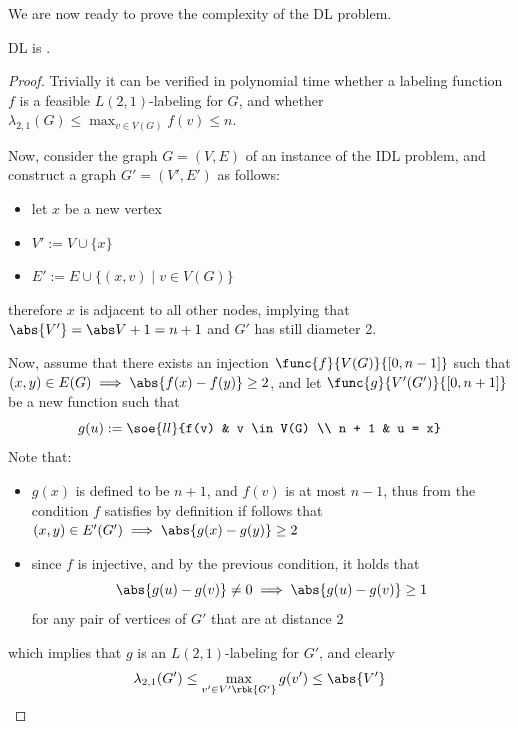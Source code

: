 \documentclass[a4paper, 12pt]{report}
\begin{document}
    We are now ready to prove the complexity of the DL problem.

    \begin{framedthm}{}
        DL is \NPComplete.
    \end{framedthm}

    \begin{proof}
        Trivially it can be verified in polynomial time whether a labeling function $f$ is a feasible $L(2,1)$-labeling for $G$, and whether $\displaystyle \lambda_{2,1}(G) \le \max_{v \in V(G)}{f(v)} \le n$.

        Now, consider the graph $G = (V, E)$ of an instance of the IDL problem, and construct a graph $G' = (V', E')$ as follows:

        \begin{itemize}
            \item let $x$ be a new vertex
            \item $V' := V \cup \{x\}$
            \item $E' := E \cup \{(x, v) \mid v \in V(G)\}$
        \end{itemize}
        
        therefore $x$ is adjacent to all other nodes, implying that $\abs{V'} = \abs V + 1 = n + 1$ and $G'$ has still diameter 2.

        Now, assume that there exists an injection $\func{f}{V(G)}{[0, n - 1]}$ such that $(x, y) \in E(G) \implies \abs{f(x) - f(y)} \ge 2$, and let $\func{g}{V'(G')}{[0, n + 1]}$ be a new function such that $$g(u) := \soe{ll}{f(v) & v \in V(G) \\ n + 1 & u = x}$$ Note that:

        \begin{itemize}
            \item $g(x)$ is defined to be $n + 1$, and $f(v)$ is at most $n - 1$, thus from the condition $f$ satisfies by definition if follows that $(x, y) \in E'(G') \implies \abs{g(x) - g(y)} \ge 2$
            \item since $f$ is injective, and by the previous condition, it holds that $$\abs{g(u) - g(v)} \neq 0 \implies \abs{g(u) - g(v)} \ge 1$$ for any pair of vertices of $G'$ that are at distance 2
        \end{itemize}

        which implies that $g$ is an $L(2,1)$-labeling for $G'$, and clearly $$\displaystyle \lambda_{2,1}(G') \le \max_{v ' \in V'\rbk{G'}}{g(v')} \le \abs{V'}$$


\end{proof}
\end{document}
